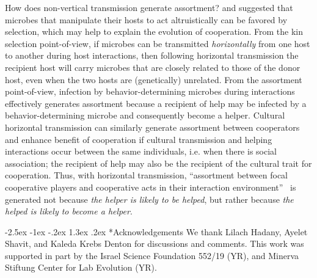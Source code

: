 \documentclass[12pt]{extarticle}
\makeatletter
\renewcommand\section{\@startsection {section}{1}{\z@}%
     {-2.5ex \@plus -1ex \@minus -.2ex}%
     {1.3ex \@plus.2ex}%
    {\Large\bfseries}}
\makeatother
\begin{document}
How does non-vertical transmission generate assortment? 
\citet{lewin2017microbes} and \citet{lewin2020rockpaperscissors} 
suggested that microbes that manipulate their hosts to act altruistically can be favored by selection, which may help to explain the evolution of cooperation. 
From the kin selection point-of-view, if microbes can be transmitted \emph{horizontally} from one host to another during host interactions, then following horizontal transmission the recipient host will carry microbes that are closely related to those of the donor host, 
even when the two hosts are (genetically) unrelated. 
From the assortment point-of-view,
infection by behavior-determining microbes during interactions effectively generates assortment because a recipient of help may be infected by a behavior-determining microbe and consequently become a helper.
Cultural horizontal transmission can similarly generate assortment between cooperators and enhance benefit of cooperation if cultural transmission and helping interactions occur between the same individuals, i.e. when there is social association; the recipient of help may also be the recipient of the cultural trait for cooperation. 
Thus, with horizontal transmission, ``assortment between focal cooperative players and cooperative acts in their interaction
environment''~\citep{Fletcher2009assortment} is generated not because \emph{the helper is likely to be helped}, but rather because \emph{the helped is likely to become a helper}.



{\small
\section*{Acknowledgements}
We thank Lilach Hadany, Ayelet Shavit, and Kaleda Krebs Denton for discussions and comments.
This work was supported in part by
the Israel Science Foundation 552/19 (YR),
and Minerva Stiftung Center for Lab Evolution (YR).
}
\end{document}
